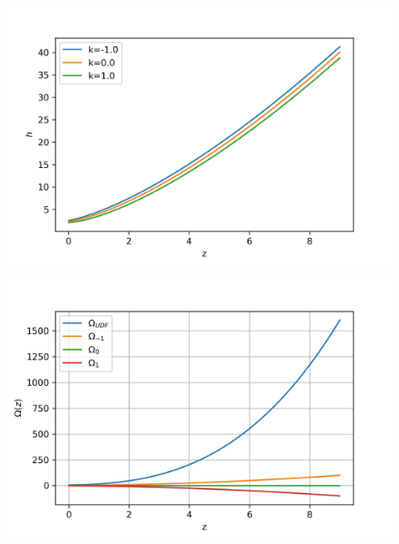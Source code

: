 \documentclass{beamer}
\begin{document}
{\begin{frame}
\begin{figure}[ht]
    \begin{minipage}{0.49\linewidth}
        \centering
        \includegraphics[width=\textwidth]{./Images/UDF_H.jpg}
		\label{fig:UDFH}
    \end{minipage}
    \begin{minipage}{0.49\linewidth}
        \centering
        \includegraphics[width=\textwidth]{./Images/UDF_Om.jpg}
		\label{fig:UDFFracEnDen}
    \end{minipage}
\end{figure}


\end{frame}}
\end{document}
